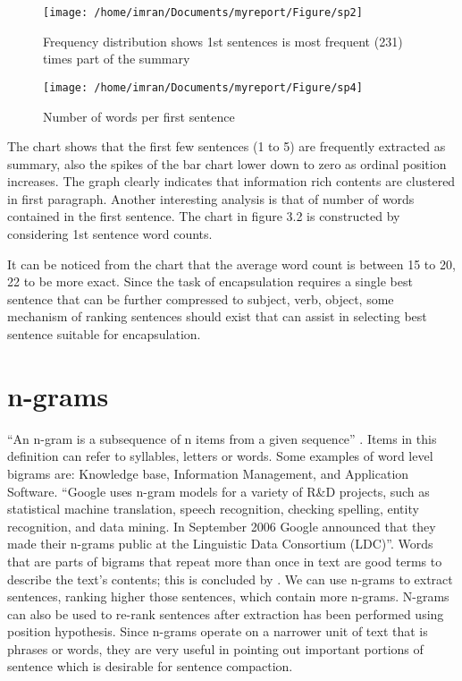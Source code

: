 \begin{figure}[h]
 \texttt{[image: /home/imran/Documents/myreport/Figure/sp2]}
 \caption{\singlespace Frequency distribution shows 1st sentences is most frequent (231) times part of the summary}
 \label{ch3:sp2}
\end{figure}

\begin{figure}[h]
 \texttt{[image: /home/imran/Documents/myreport/Figure/sp4]}
 \caption{\singlespace Number of words per first sentence}
\end{figure}

The chart shows that the first few sentences (1 to 5) are frequently extracted as summary, also the spikes of the bar chart lower down to zero as ordinal position increases.
The graph clearly indicates that information rich contents are clustered in first paragraph. Another interesting analysis is that of number of words contained in the first 
sentence. The chart in figure 3.2 is constructed by considering 1st sentence word counts. 

It can be noticed from the chart that the average word count is between 15 to 20, 22 to be more exact. Since the task of encapsulation requires a single best sentence
that can be further compressed to subject, verb, object, some mechanism of ranking sentences should exist that can assist in selecting best sentence suitable 
for encapsulation.
\section{n-grams}
``An n-gram is a subsequence of n items from a given sequence'' . Items in this definition can refer to syllables, letters or words. Some examples of word level bigrams are: 
Knowledge base, Information Management, and Application Software. ``Google uses n-gram models for a variety of R\&D projects, such as statistical machine translation, 
speech recognition, checking spelling, entity recognition, and data mining. In September 2006 Google announced that they made their n-grams public at the Linguistic 
Data Consortium (LDC)''. Words that are parts of bigrams that repeat more than once in text are good terms to describe the text's contents; this is concluded
by . We can use n-grams to extract sentences, ranking higher those sentences, which contain more n-grams. N-grams can also be used 
to re-rank sentences after extraction has been performed using position hypothesis. Since n-grams operate on a narrower unit of text that is
phrases or words, they are very useful in pointing out important portions of sentence which is desirable for sentence compaction.
